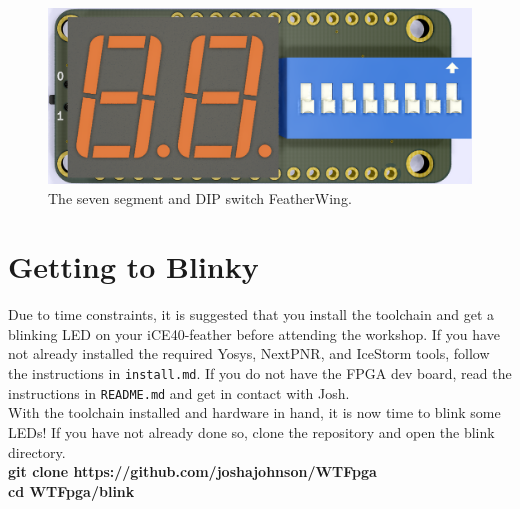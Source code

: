 \documentclass[12pt,a4paper]{article}
\begin{document}
\begin{figure}[H]
\begin{centering}
	\includegraphics[width=\linewidth]{7segment_render.PNG}
	\caption{The seven segment and DIP switch FeatherWing.}
\end{centering}
\end{figure}
\newpage
\section{Getting to Blinky}
Due to time constraints, it is suggested that you install the toolchain and get a blinking LED on your iCE40-feather before attending the workshop. If you have not already installed the required Yosys, NextPNR, and IceStorm tools, follow the instructions in \texttt{install.md}. If you do not have the FPGA dev board, read the instructions in \texttt{README.md} and get in contact with Josh. \\

\noindent
With the toolchain installed and hardware in hand, it is now time to blink some LEDs! If you have not already done so, clone the repository and open the blink directory.\\

\noindent
\textbf{git clone https://github.com/joshajohnson/WTFpga} \\
\textbf{cd WTFpga/blink}\\
\end{document}
